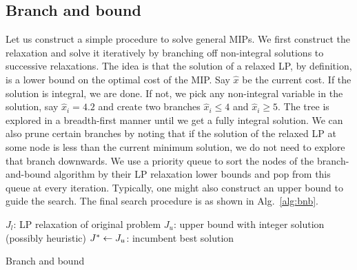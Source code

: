 \documentclass[letterpaper, 10pt, twocolumn, reqno]{amsart}
\begin{document}
\subsection{Branch and bound}
\label{ssec:branch_and_bound}

Let us construct a simple procedure to solve general MIPs. We first construct
the relaxation and solve it iteratively by branching off non-integral solutions to successive relaxations. The idea is that the solution of a
relaxed LP, by definition, is a lower bound on the optimal cost of the MIP. Say $\hat{x}$ be the current cost. If the solution is integral, we are done. If not, we pick any non-integral variable in the solution, say $\hat{x}_i = 4.2$ and create two branches $\hat{x}_i \leq 4$ and $\hat{x}_i \geq 5$. The tree
is explored in a breadth-first manner until we get a fully integral solution. We can also prune certain branches by noting that if the solution of the
relaxed LP at some node is less than the current minimum solution, we do not need to explore that branch downwards. We use a priority queue to sort the nodes of the branch-and-bound algorithm by their LP relaxation lower bounds and pop from this queue at every iteration. Typically, one might also construct an upper bound to guide the search.
%
The final search procedure is as shown in Alg.~\ref{alg:bnb}.
\IncMargin{0.04in}
\begin{algorithm}[!h]
\footnotesize
$J_l$: LP relaxation of original problem\;
$J_u$: upper bound with integer solution (possibly heuristic)\;
$J^* \leftarrow J_u$: incumbent best solution\;
\vspace{0.05in}
{
}
\caption{Branch and bound}
\label{alg:bnb}
\end{algorithm}
\DecMargin{0.04in}
\end{document}

